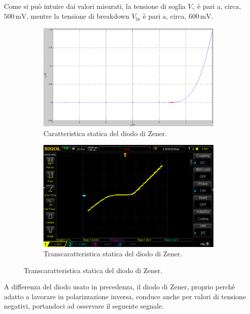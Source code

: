\documentclass[a4paper]{article}
\begin{document}
				Come si può intuire dai valori misurati, la tensione di soglia $ V_{\mathrm{\gamma}} $ è pari a, circa, $ 500 \, \mathrm{mV} $, mentre la tensione di breakdown $ V_{\mathrm{br}} $ è pari a, circa, $ 600 \, \mathrm{mV} $.
				\begin{figure}[h!]
					\centering
					\begin{subfigure}{0.5\textwidth}
						\centering
						\includegraphics[scale=0.2]{caratteristicheStaticheDiodoDiZenerCaratteristica}
						\caption{Caratteristica statica del diodo di Zener.}
					\end{subfigure}
					\begin{subfigure}{0.3\textwidth}
						\centering
						\includegraphics[scale=0.2]{caratteristicheStaticheDiodoDiZenerTranscaratteristica}
						\caption{Transcaratteristica statica del diodo di Zener.}
					\end{subfigure}
					\label{fig:caratteristicheStaticheDiodoDiZener}
				\end{figure}
				\newline
				A differenza del diodo usato in precedenza, il diodo di Zener, proprio perchè adatto a lavorare in polarizzazione inversa, conduce anche per valori di tensione negativi, portandoci ad osservare il seguente segnale.		
\end{document}
